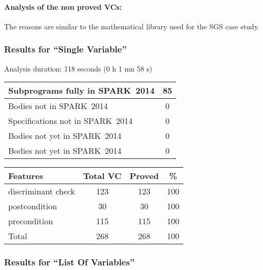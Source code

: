 \documentclass[10pt,a4paper,twocolumn]{article}
\newcommand{\newspark}{SPARK~2014\xspace}
\begin{document}
\paragraph{Analysis of the non proved VCs:}
The reasons are similar to the mathematical library used for the SGS case study.

\subsubsection{Results for ``Single Variable''}

Analysis duration: 118 seconds (0 h 1 mn 58 s)

\vspace{5mm}

\begin{tabular}{|l|c|}
\hline
Subprograms fully in \newspark  & 85 \\
\hline
Bodies not in \newspark         & 0  \\
\hline
Specifications not in \newspark & 0  \\
\hline
Bodies not yet in \newspark     & 0  \\
\hline
Bodies not yet in \newspark     & 0  \\
\hline
\end{tabular}

\vspace{5mm}

\begin{tabular}{|l|c|c|c|}
\hline
Features           & Total VC & Proved & \%  \\ %
\hline
discriminant check & 123      & 123    & 100 \\ %
\hline
postcondition      & 30       & 30     & 100 \\ %
\hline
precondition       & 115      & 115    & 100 \\ %
\hline
Total              & 268      & 268    & 100 \\ %
\hline
\end{tabular}

\subsubsection{Results for ``List Of Variables''}
\end{document}
